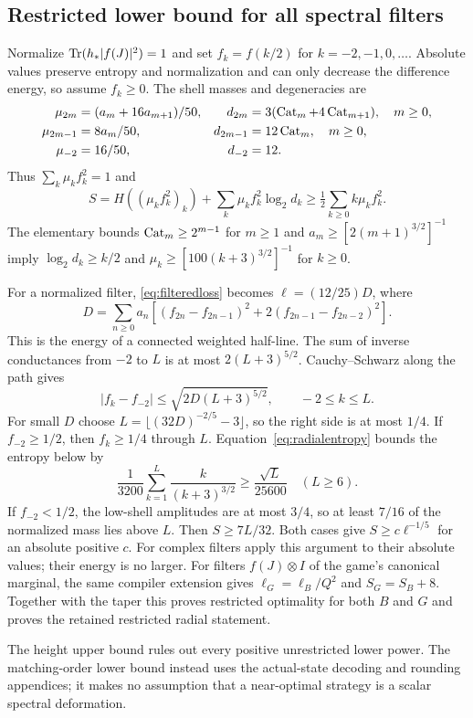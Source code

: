 \subsection{Restricted lower bound for all spectral filters}
Normalize $\operatorname{Tr}(h_*|f(J)|^2)=1$ and set $f_k=f(k/2)$ for $k=-2,-1,0,\ldots$. Absolute values preserve entropy and normalization and can only decrease the difference energy, so assume $f_k\geq0$. The shell masses and degeneracies are
\begin{align*}
 \mu_{2m}&=(a_m+16a_{m+1})/50,&d_{2m}&=3(\operatorname{Cat}_m+4\operatorname{Cat}_{m+1}),\quad m\geq0,\\
 \mu_{2m-1}&=8a_m/50,&d_{2m-1}&=12\operatorname{Cat}_m,\quad m\geq0,\\
 \mu_{-2}&=16/50,&d_{-2}&=12.
\end{align*}
Thus $\sum_k\mu_kf_k^2=1$ and
\begin{equation}\label{eq:radialentropy}
 S=H((\mu_kf_k^2)_k)+\sum_k\mu_kf_k^2\log_2d_k
 \geq\tfrac12\sum_{k\geq0}k\mu_kf_k^2.
\end{equation}
The elementary bounds $\operatorname{Cat}_m\geq2^{m-1}$ for $m\geq1$ and $a_m\geq[2(m+1)^{3/2}]^{-1}$ imply $\log_2d_k\geq k/2$ and $\mu_k\geq[100(k+3)^{3/2}]^{-1}$ for $k\geq0$.

For a normalized filter, \eqref{eq:filteredloss} becomes $\ell=(12/25)D$, where
\[
 D=\sum_{n\geq0}a_n[(f_{2n}-f_{2n-1})^2
                          +2(f_{2n-1}-f_{2n-2})^2].
\]
This is the energy of a connected weighted half-line. The sum of inverse conductances from $-2$ to $L$ is at most $2(L+3)^{5/2}$. Cauchy--Schwarz along the path gives
\[
 |f_k-f_{-2}|\leq\sqrt{2D(L+3)^{5/2}},\qquad -2\leq k\leq L.
\]
For small $D$ choose $L=\lfloor(32D)^{-2/5}-3\rfloor$, so the right side is at most $1/4$. If $f_{-2}\geq1/2$, then $f_k\geq1/4$ through $L$. Equation~\eqref{eq:radialentropy} bounds the entropy below by
\[
 \frac1{3200}\sum_{k=1}^L\frac{k}{(k+3)^{3/2}}
 \geq\frac{\sqrt L}{25600}\quad(L\geq6).
\]
If $f_{-2}<1/2$, the low-shell amplitudes are at most $3/4$, so at least $7/16$ of the normalized mass lies above $L$. Then $S\geq7L/32$. Both cases give $S\geq c\ell^{-1/5}$ for an absolute positive $c$. For complex filters apply this argument to their absolute values; their energy is no larger. For filters $f(J)\otimes I$ of the game's canonical marginal, the same compiler extension gives $\ell_G=\ell_B/Q^2$ and $S_G=S_B+8$. Together with the taper this proves restricted optimality for both $B$ and $G$ and proves the retained restricted radial statement.

The height upper bound rules out every positive unrestricted lower power. The matching-order lower bound instead uses the actual-state decoding and rounding appendices; it makes no assumption that a near-optimal strategy is a scalar spectral deformation.

